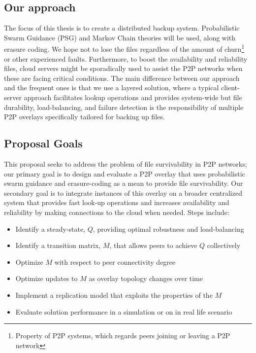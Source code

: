 \documentclass[runningheads]{llncs}
\begin{document}
\subsection{Our approach}
The focus of this thesis is to create a distributed backup system. Probabilistic Swarm Guidance (PSG) and Markov Chain theories will be used, along with erasure coding. We hope not to lose the files regardless of the amount of churn\footnote{Property of P2P systems, which regards peers joining or leaving a P2P network} or other experienced faults. Furthermore, to boost the availability and reliability files, cloud servers might be sporadically used to assist the P2P networks when these are facing critical conditions. The main difference between our approach and the frequent ones is that we use a layered solution, where a typical client-server approach facilitates lookup operations and provides system-wide but file durability, load-balancing, and failure detection is the responsibility of multiple P2P overlays specifically tailored for backing up files.

\subsection{Proposal Goals}\label{subsec:intro}
This proposal seeks to address the problem of file survivability in P2P networks; our primary goal is to design and evaluate a P2P overlay that uses probabilistic swarm guidance and erasure-coding as a mean to provide file survivability. Our secondary goal is to integrate instances of this overlay on a broader centralized system that provides fast look-up operations and increases availability and reliability by making connections to the cloud when needed. Steps include:

\begin{itemize}
    \item Identify a steady-state, $Q$, providing optimal robustness and load-balancing
    \item Identify a transition matrix, $M$, that allows peers to achieve $Q$ collectively
    \item Optimize $M$ with respect to peer connectivity degree
    \item Optimize updates to $M$ as overlay topology changes over time
    \item Implement a replication model that exploits the properties of the $M$
    \item Evaluate solution performance in a simulation or on in real life scenario
\end{itemize}
\end{document}
